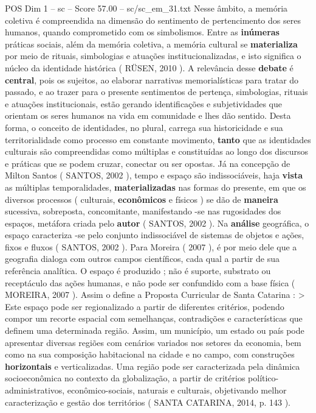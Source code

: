 \begin{textsample}{POS Dim 1 – sc – Score 57.00 – sc/sc\_em\_31.txt}
Nesse âmbito, a memória coletiva é compreendida na dimensão do sentimento de pertencimento dos seres humanos, quando comprometido com os simbolismos.
Entre as \textbf{inúmeras} práticas sociais, além da memória coletiva, a memória cultural se \textbf{materializa} por meio de rituais, simbologias e atuações institucionalizadas, e isto significa o núcleo da identidade histórica ( RÜSEN, 2010 ).
A relevância desse \textbf{debate} é \textbf{central}, pois os sujeitos, ao elaborar narrativas memorialísticas para tratar do passado, e ao trazer para o presente sentimentos de pertença, simbologias, rituais e atuações institucionais, estão gerando identificações e subjetividades que orientam os seres humanos na vida em comunidade e lhes dão sentido.
Desta forma, o conceito de identidades, no plural, carrega sua historicidade e sua territorialidade como processo em constante movimento, \textbf{tanto} que as identidades culturais são compreendidas como múltiplas e constituídas ao longo dos discursos e práticas que se podem cruzar, conectar ou ser opostas.
Já na concepção de Milton Santos ( SANTOS, 2002 ), tempo e espaço são indissociáveis, haja \textbf{vista} as múltiplas temporalidades, \textbf{materializadas} nas formas do presente, em que os diversos processos ( culturais, \textbf{econômicos} e físicos ) se dão de \textbf{maneira} sucessiva, sobreposta, concomitante, manifestando -se nas rugosidades dos espaços, metáfora criada pelo \textbf{autor} ( SANTOS, 2002 ).
Na \textbf{análise} geográfica, o espaço caracteriza -se pelo conjunto indissociável de sistemas de objetos e ações, fixos e fluxos ( SANTOS, 2002 ).
Para Moreira ( 2007 ), é por meio dele que a geografia dialoga com outros campos científicos, cada qual a partir de sua referência analítica.
O espaço é produzido ; não é suporte, substrato ou receptáculo das ações humanas, e não pode ser confundido com a base física ( MOREIRA, 2007 ).
Assim o define a Proposta Curricular de Santa Catarina : > Este espaço pode ser regionalizado a partir de diferentes critérios, podendo compor um recorte espacial com semelhanças, contradições e características que definem uma determinada região.
Assim, um município, um estado ou país pode apresentar diversas regiões com cenários variados nos setores da economia, bem como na sua composição habitacional na cidade e no campo, com construções \textbf{horizontais} e verticalizadas.
Uma região pode ser caracterizada pela dinâmica socioeconômica no contexto da globalização, a partir de critérios político-administrativos, econômico-sociais, naturais e culturais, objetivando melhor caracterização e gestão dos territórios ( SANTA CATARINA, 2014, p. 143 ).

\end{textsample}

